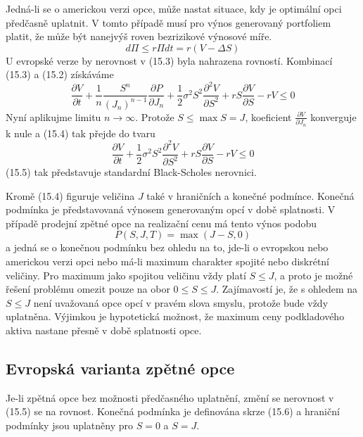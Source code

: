 \documentclass[a4paper]{book}
\begin{document}
Jedná-li se o americkou verzi opce, může nastat situace, kdy je optimální opci předčasně uplatnit. V tomto případě musí pro výnos generovaný portfoliem platit, že může být nanejvýš roven bezrizikové výnosové míře.
\begin{equation}
d \Pi \le r \Pi dt = r(V - \Delta S)
\end{equation}
U evropské verze by nerovnost v (15.3) byla nahrazena rovností. Kombinací (15.3) a (15.2) získáváme
\begin{equation}
\frac{\partial V}{\partial t} + \frac{1}{n}\frac{S^n}{(J_n)^{n-1}}\frac{\partial P}{\partial J_n} + \frac{1}{2}\sigma^2 S^2 \frac{\partial^2 V}{\partial S^2} + rS\frac{\partial V}{\partial S} - rV \le 0
\end{equation}
Nyní aplikujme limitu $n \rightarrow \infty$. Protože $S \le \max S = J$, koeficient $\frac{\partial V}{\partial J_n}$ konverguje k nule a (15.4) tak přejde do tvaru
\begin{equation}
\frac{\partial V}{\partial t} + \frac{1}{2}\sigma^2 S^2 \frac{\partial^2 V}{\partial S^2} + rS\frac{\partial V}{\partial S} - rV \le 0
\end{equation}
(15.5) tak představuje standardní Black-Scholes nerovnici.

Kromě (15.4) figuruje veličina $J$ také v hraničních a konečné podmínce. Konečná podmínka je představovaná výnosem generovaným opcí v době splatnosti. V případě prodejní zpětné opce na realizační cenu má tento výnos podobu
\begin{equation}
P(S,J,T) = \max(J - S, 0)
\end{equation}
a jedná se o konečnou podmínku bez ohledu na to, jde-li o evropskou nebo americkou verzi opci nebo má-li maximum charakter spojité nebo diskrétní veličiny. Pro maximum jako spojitou veličinu vždy platí $S \le J$, a proto je možné řešení problému omezit pouze na obor $0 \le S \le J$. Zajímavostí je, že s ohledem na $S \le J$ není uvažovaná opce opcí v pravém slova smyslu, protože bude vždy uplatněna. Výjimkou je hypotetická možnost, že maximum ceny podkladového aktiva nastane přesně v době splatnosti opce.

\subsection{Evropská varianta zpětné opce}

Je-li zpětná opce bez možnosti předčasného uplatnění, změní se nerovnost v (15.5) se na rovnost. Konečná podmínka je definována skrze (15.6) a hraniční podmínky jsou uplatněny pro $S = 0$ a $S = J$.
\end{document}
